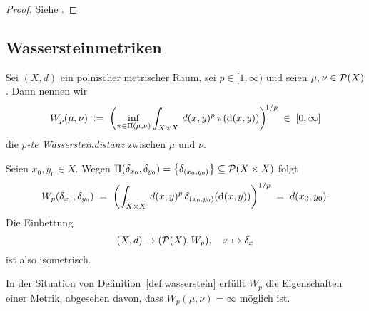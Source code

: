 \documentclass[../main/main.tex]{subfiles}
\begin{document}
	\begin{proof}
		Siehe \cite[Folgerung 5.21]{Villani.2009}.
	\end{proof}

	\subsection{Wassersteinmetriken}

	\begin{Definition}
		\label{def:wasserstein}
		Sei $(X, d)$ ein polnischer metrischer Raum, sei $p \in [1, \infty)$ und seien $\mu, \nu \in \mathcal{P}(X)$. Dann nennen wir
		$$ W_p(\mu, \nu) \; \vcentcolon = \; \left(\inf_{\pi \in \Pi(\mu, \nu)} \int_{X \times X} \, d(x, y)^p \, \pi(\mathrm{d}(x, y))\right)^{\! 1/p} \; \in \; [0, \infty] $$
		die \emph{$p$-te Wassersteindistanz} zwischen $\mu$ und $\nu$.
	\end{Definition}

	\begin{Bemerkung}
		Seien $x_0, y_0 \in X$. Wegen $\Pi(\delta_{x_0}, \delta_{y_0}) = \left\{\delta_{(x_0, y_0)}\right\} \subseteq \mathcal{P}(X \times X)$ folgt
		\[ W_p(\delta_{x_0}, \delta_{y_0}) \; = \; \left( \int_{X \times X} \, d(x, y)^p \, \delta_{(x_0, y_0)}(\mathrm{d}(x, y)) \right)^{1/p} \; = \; d(x_0, y_0) \text{.} \]
		Die Einbettung 
		\[ (X, d) \to (\mathcal{P}(X), W_p), \quad x \mapsto \delta_x \]
		ist also isometrisch.
	\end{Bemerkung}

	\begin{Satz}
		\label{thm:wassersteinismetric}
		In der Situation von Definition~\ref{def:wasserstein} erfüllt $W_p$ die Eigenschaften einer Metrik, abgesehen davon, dass $W_p(\mu, \nu) = \infty$ möglich ist.
	\end{Satz}
\end{document}
